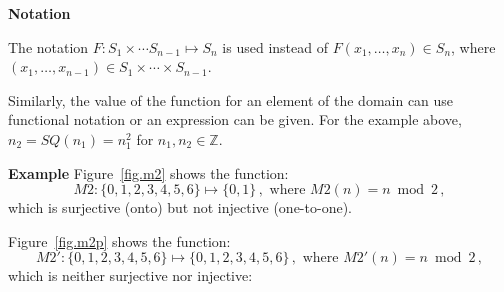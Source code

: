 \documentclass[12pt,a4paper]{article}
\newenvironment{example}{\textbf{Example}}{}
\begin{document}
\textbf{Notation}

The notation $F:S_1\times \cdots S_{n-1}\mapsto S_n$ is used instead of $F(x_{1},\ldots,x_{n})\in S_n$, where $(x_{1},\ldots,x_{n-1})\in S_{1}\times \cdots \times S_{n-1}$.

Similarly, the value of the function for an element of the domain can use functional notation or an expression can be given. For the example above, $n_2=SQ(n_1)=n_1^2$ for $n_1,n_2\in \mathbb{Z}$.


\begin{example}
Figure~\ref{fig.m2} shows the function:
\[
M2: \{0,1,2,3,4,5,6\} \mapsto \{0,1\}\,, \textrm{\ where \ } M2(n) = n \bmod 2\,,
\]
which is surjective (onto) but not injective (one-to-one).

Figure~\ref{fig.m2p} shows the function:
\[
M2': \{0,1,2,3,4,5,6\} \mapsto \{0,1,2,3,4,5,6\}\,, \textrm{\ where \ } M2'(n) = n \bmod 2\,,
\]
which is neither surjective nor injective:
\end{example}
\end{document}
